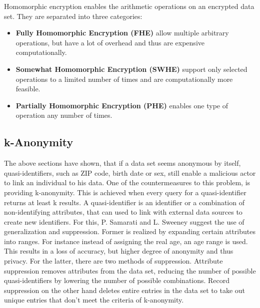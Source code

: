 Homomorphic encryption enables the arithmetic operations on an encrypted data set. They are separated into three categories:
\begin{itemize}
	\item \textbf{Fully Homomorphic Encryption (FHE)} allow multiple arbitrary operations, but have a lot of overhead and thus are expensive computationally.
	\item \textbf{Somewhat Homomorphic Encryption (SWHE)} support only selected operations to a limited number of times and are computationally more feasible.
	\item \textbf{Partially Homomorphic Encryption (PHE)} enables one type of operation any number of times.
\end{itemize}

\subsection{k-Anonymity}
The above sections have shown, that if a data set seems anonymous by itself, quasi-identifiers, such as ZIP code, birth date or sex, still enable a malicious actor to link an individual to his data. One of the countermeasures to this problem, is providing k-anonymity. This is achieved when every query for a quasi-identifier returns at least k results. A quasi-identifier is an identifier or a combination of non-identifying attributes, that can used to link with external data sources to create new identifiers. For this, P. Samarati and L. Sweeney suggest the use of generalization and suppression.
Former is realized by expanding certain attributes into ranges. For instance instead of assigning the real age, an age range is used. This results in a loss of accuracy, but higher degree of anonymity and thus privacy. For the latter, there are two methods of suppression. Attribute suppression removes attributes from the data set, reducing the number of possible quasi-identifiers by lowering the number of possible combinations. Record suppression on the other hand deletes entire entries in the data set to take out unique entries that don't meet the criteria of k-anonymity.

